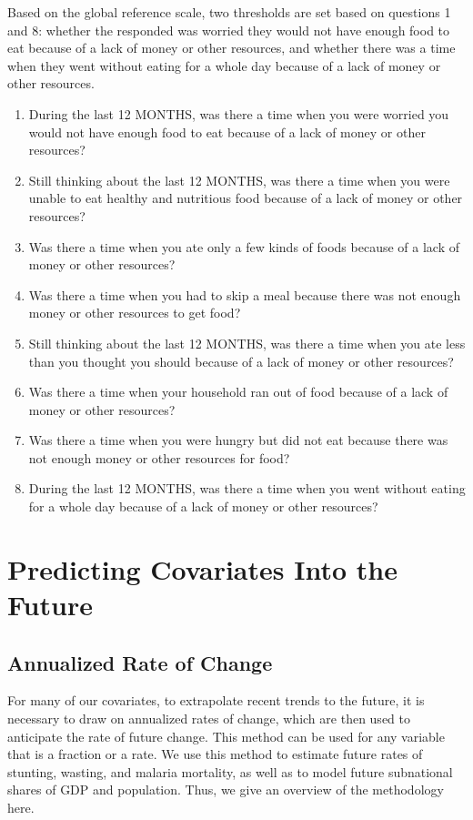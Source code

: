 \documentclass{article}
\begin{document}
Based on the global reference scale, two thresholds are set based on questions 1 and 8: whether the responded was worried they would not have enough food to eat because of a lack of money or other resources, and whether there was a time when they went without eating for a whole day because of a lack of money or other resources.



\begin{enumerate}
	\item During the last 12 MONTHS, was there a time when you were worried you would not have enough food to eat because of a lack of money or other resources?
	\item Still thinking about the last 12 MONTHS, was there a time when you were unable to eat healthy and nutritious food because of a lack of money or other resources?
	\item Was there a time when you ate only a few kinds of foods because of a lack of money or other resources?
	\item Was there a time when you had to skip a meal because there was not enough money or other resources to get food?
	\item Still thinking about the last 12 MONTHS, was there a time when you ate less than you thought you should because of a lack of money or other resources?
	\item Was there a time when your household ran out of food because of a lack of money or other resources?
	\item Was there a time when you were hungry but did not eat because there was not enough money or other resources for food?
	\item During the last 12 MONTHS, was there a time when you went without eating for a whole day because of a lack of money or other resources?
  \label{itm:fies}
\end{enumerate}

\section{Predicting Covariates Into the Future}
\subsection{Annualized Rate of Change}
For many of our covariates, to extrapolate recent trends to the future, it is necessary to draw on annualized rates of change, which are then used to anticipate the rate of future change.  This method can be used for any variable that is a fraction or a rate.  We use this method to estimate future rates of stunting, wasting, and malaria mortality, as well as to model future subnational shares of GDP and population.  Thus, we give an overview of the methodology here.
\end{document}
